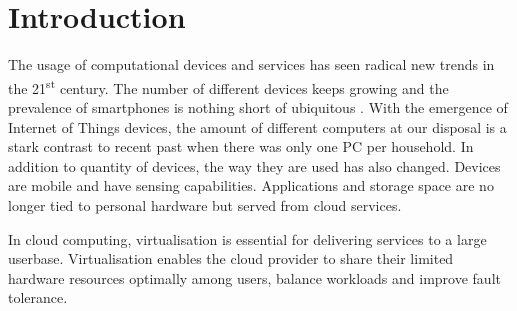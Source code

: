 \section{Introduction}

The usage of computational devices and services has seen radical new trends in the 21\textsuperscript{st} century. The number of different devices keeps growing and the prevalence of smartphones is nothing short of ubiquitous \cite{anderson2015technology}. With the emergence of Internet of Things devices, the amount of different computers at our disposal is a stark contrast to recent past when there was only one PC per household. In addition to quantity of devices, the way they are used has also changed. Devices are mobile and have sensing capabilities. Applications and storage space are no longer tied to personal hardware but served from cloud services.

In cloud computing, virtualisation is essential for delivering services to a large userbase. Virtualisation enables the cloud provider to share their limited hardware resources optimally among users, balance workloads and improve fault tolerance.
